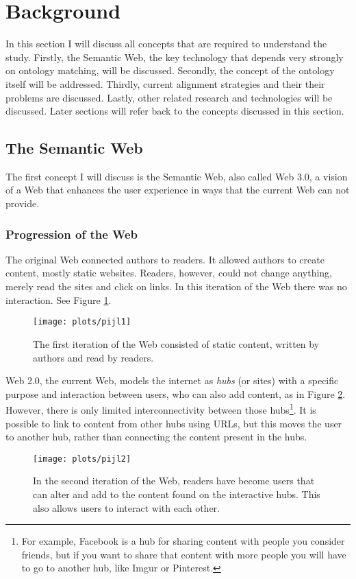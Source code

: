 \documentclass{article}
\begin{document}
\newpage
\section{Background}
 In this section I will discuss all concepts that are required to understand the study. Firstly, the Semantic Web, the key technology that depends very strongly on ontology matching, will be discussed. Secondly, the concept of the ontology itself will be addressed. Thirdly, current alignment strategies and their their problems are discussed. Lastly, other related research and technologies will be discussed. Later sections will refer back to the concepts discussed in this section.
 \subsection{The Semantic Web}
  The first concept I will discuss is the Semantic Web, also called Web 3.0, a vision of a Web that enhances the user experience in ways that the current Web can not provide.
 \subsubsection{Progression of the Web}
 The original Web connected authors to readers. It allowed authors to create content, mostly static websites. Readers, however, could not change anything, merely read the sites and click on links. In this iteration of the Web there was no interaction\cite{web1}. See Figure \ref{web1}. 
 
 \begin{figure}[H]
 \centering
 \texttt{[image: plots/pijl1]}
 \caption[Web 1.0]{The first iteration of the Web consisted of static content, written by authors and read by readers.}
 \label{web1}
 \end{figure}
 
 Web 2.0, the current Web, models the internet as \textit{hubs} (or sites) with a specific purpose and interaction between users, who can also add content, as in Figure \ref{web2}. However, there is only limited interconnectivity between those hubs\footnote{For example, Facebook is a hub for sharing content with people you consider friends, but if you want to share that content with more people you will have to go to another hub, like Imgur or Pinterest.}\cite{web2}.
 It is possible to link to content from other hubs using URLs, but this moves the user to another hub, rather than connecting the content present in the hubs.
 
 \begin{figure}[H]
 \centering
 \texttt{[image: plots/pijl2]}
 \caption[Web 2.0]{In the second iteration of the Web, readers have become users that can alter and add to the content found on the interactive hubs. This also allows users to interact with each other.}
 \label{web2}
 \end{figure}
 
\end{document}
